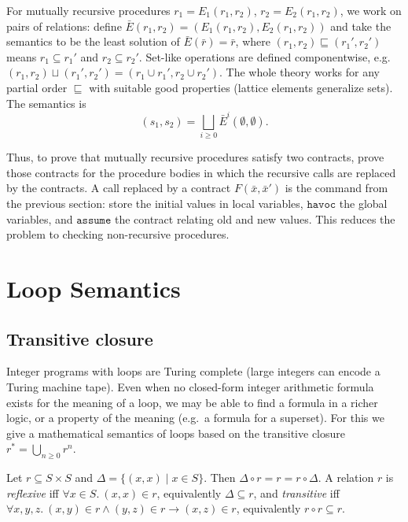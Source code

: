 For mutually recursive procedures $r_1 = E_1(r_1, r_2)$, $r_2 = E_2(r_1, r_2)$, we work on pairs of relations: define $\bar E(r_1, r_2) = (E_1(r_1, r_2), E_2(r_1, r_2))$ and take the semantics to be the least solution of $\bar E(\bar r) = \bar r$, where $(r_1, r_2) \sqsubseteq (r_1', r_2')$ means $r_1 \subseteq r_1'$ and $r_2 \subseteq r_2'$. Set-like operations are defined componentwise, e.g.\ $(r_1, r_2) \sqcup (r_1', r_2') = (r_1 \cup r_1', r_2 \cup r_2')$. The whole theory works for any partial order $\sqsubseteq$ with suitable good properties (lattice elements generalize sets). The semantics is
\[
(s_1, s_2) = \bigsqcup_{i \ge 0} \bar E^i(\emptyset, \emptyset).
\]
 
 
Thus, to prove that mutually recursive procedures satisfy two contracts, prove those contracts for the procedure bodies in which the recursive calls are replaced by the contracts. A call replaced by a contract $F(\bar x, \bar x')$ is the command from the previous section: store the initial values in local variables, $\texttt{havoc}$ the global variables, and $\texttt{assume}$ the contract relating old and new values. This reduces the problem to checking non-recursive procedures.
 
\section{Loop Semantics}
 
\subsection*{Transitive closure}
 
Integer programs with loops are Turing complete (large integers can encode a Turing machine tape). Even when no closed-form integer arithmetic formula exists for the meaning of a loop, we may be able to find a formula in a richer logic, or a property of the meaning (e.g.\ a formula for a superset). For this we give a mathematical semantics of loops based on the transitive closure $r^* = \bigcup_{n \ge 0} r^n$.
 
Let $r \subseteq S \times S$ and $\Delta = \{(x, x) \mid x \in S\}$. Then $\Delta \circ r = r = r \circ \Delta$. A relation $r$ is \emph{reflexive} iff $\forall x \in S.\ (x, x) \in r$, equivalently $\Delta \subseteq r$, and \emph{transitive} iff $\forall x, y, z.\ (x, y) \in r \wedge (y, z) \in r \rightarrow (x, z) \in r$, equivalently $r \circ r \subseteq r$.
 
